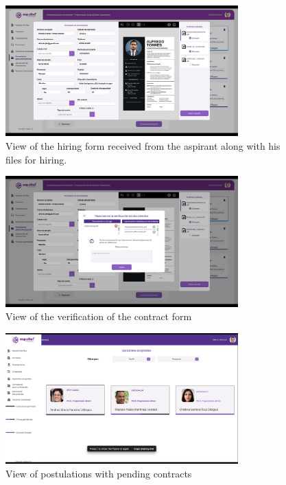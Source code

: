 \documentclass{scrreprt}
\begin{document}
\begin{figure}[H]
	\centering \small
	\includegraphics[width=0.8\textwidth]{WebPrototype/wflow-36.jpeg}
	\caption{View of the hiring form received from the aspirant along with his files for hiring.}
\end{figure}

\begin{figure}[H]
	\centering \small
	\includegraphics[width=0.8\textwidth]{WebPrototype/wflow-37.jpeg}
	\caption{View of the verification of the contract form}
\end{figure}

\begin{figure}[H]
	\centering \small
	\includegraphics[width=0.8\textwidth]{WebPrototype/wflow-38.jpeg}
	\caption{View of postulations with pending contracts}
\end{figure}
\end{document}
